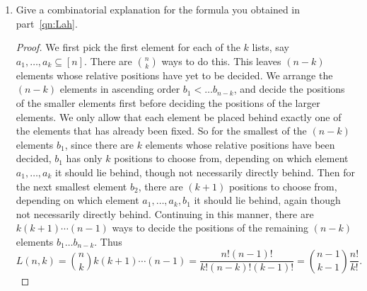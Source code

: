 \documentclass{article}
\begin{document}
\begin{enumerate}[label={(\alph*)}]
\begin{proof}
        Observe that $[x^n](1+x+x^2+\ldots)^k$ is the same as the number of
        $k$-tuples of non-negative integers that sum to $n$, which is the
        same as number of weak compositions of $n$ into $k$ parts, which
        equals $\binom{n+k-1}{n}$ (Proposition 13.3). Thus we can further
        simplify
        \begin{align*}
          A(x,y) &=\sum_{k\geq0} \frac{x^ky^k}{k!} (1+x+x^2+\ldots)^k\\
          &=\sum_{k\geq0} \frac{x^ky^k}{k!} \sum_{n\geq0} \binom{n+k-1}{n}
            x^n\\
          &=\sum_{n,k\geq0} \frac{1}{k!} \binom{n+k-1}{n} x^{n+k}y^k\\
          &=\sum_{n,k\geq0} \frac{(n+k-1)!}{k!n!(k-1)!}
            x^{n+k}y^k,\\
          &=\sum_{n,k\geq0} \frac{(n-1)!}{k!(n-k)!(k-1)!} x^{n}y^k.\\
        \end{align*}

        Then
        \begin{align*}
          L(n,k) &=\left[\frac{x^ny^k}{n!}\right] A(x,y)\\
          &=\frac{n!(n-1)!}{k!(n-k)!(k-1)!}.\\
        \end{align*}
      \end{proof}

    \item Give a combinatorial explanation for the formula you obtained in
      part~\ref{qn:Lah}.
      \begin{proof}
        We first pick the first element for each of the $k$ lists, say
        $a_1,\ldots,a_k\subseteq[n]$. There
        are $\binom{n}{k}$ ways to do this. This leaves $(n-k)$ elements
        whose relative positions have yet to be decided. We arrange the
        $(n-k)$ elements in ascending order $b_1<\ldots b_{n-k}$, and
        decide the positions of the smaller elements first before deciding
        the positions of the larger elements. We only allow that each
        element be placed behind exactly one of the elements that has
        already been fixed. So for the smallest of the $(n-k)$ elements
        $b_1$, since there are $k$ elements whose relative positions have
        been decided, $b_1$ has only $k$ positions to choose from,
        depending on which element $a_1,\ldots,a_k$ it should lie behind,
        though not necessarily directly behind. Then for the next smallest
        element $b_2$, there are $(k+1)$ positions to choose from,
        depending on which element $a_1,\ldots,a_k,b_1$ it should lie behind,
        again though not necessarily directly behind. Continuing in this
        manner, there are $k(k+1)\cdots(n-1)$ ways to decide the positions
        of the remaining $(n-k)$ elements $b_1\ldots b_{n-k}$. Thus
        \[L(n,k) =\binom{n}{k} k(k+1)\cdots(n-1)
        =\frac{n!(n-1)!}{k!(n-k)!(k-1)!} =\binom{n-1}{k-1}\frac{n!}{k!}.\]
      \end{proof}


\end{enumerate}
\end{document}
